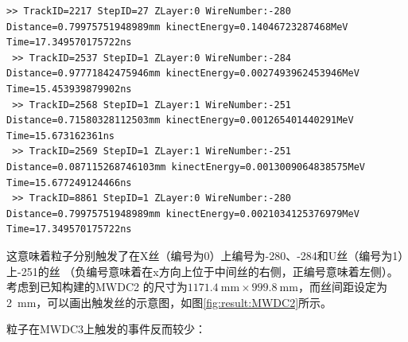 \documentclass[bachelor,openany,oneside,color]{buaathesis}
\begin{document}
\begin{lstlisting}[caption={MWDC2},firstnumber=3760,lastline=3768]
 >> TrackID=2217 StepID=27 ZLayer:0 WireNumber:-280 Distance=0.79975751948989mm kinectEnergy=0.14046723287468MeV Time=17.349570175722ns
 >> TrackID=2537 StepID=1 ZLayer:0 WireNumber:-284 Distance=0.97771842475946mm kinectEnergy=0.0027493962453946MeV Time=15.453939879902ns
 >> TrackID=2568 StepID=1 ZLayer:1 WireNumber:-251 Distance=0.71580328112503mm kinectEnergy=0.001265401440291MeV Time=15.673162361ns
 >> TrackID=2569 StepID=1 ZLayer:1 WireNumber:-251 Distance=0.087115268746103mm kinectEnergy=0.0013009064838575MeV Time=15.677249124466ns
 >> TrackID=8861 StepID=1 ZLayer:0 WireNumber:-280 Distance=0.79975751948989mm kinectEnergy=0.0021034125376979MeV Time=17.349570175722ns
\end{lstlisting}

这意味着粒子分别触发了在X丝（编号为0）上编号为-280、-284和U丝（编号为1）上-251的丝
（负编号意味着在x方向上位于中间丝的右侧，正编号意味着左侧）。考虑到已知构建的MWDC2
的尺寸为$\SI{1171.4}{\milli\meter}\times\SI{999.8}{\milli\meter}$，而丝间距设定为
\SI{2}{\milli\meter}，可以画出触发丝的示意图，如图\ref{fig:result:MWDC2}所示。

%
%
粒子在MWDC3上触发的事件反而较少：
\end{document}
